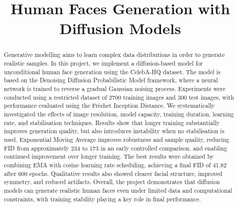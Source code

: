 \documentclass[conference]{IEEEtran}
\begin{document}
\title{Human Faces Generation with Diffusion Models\\
}

\author{
}


\maketitle

\begin{abstract}
Generative modelling aims to learn complex data distributions in order to generate realistic samples. In this project, we implement a diffusion-based model for unconditional human face generation using the CelebA-HQ dataset. The model is based on the Denoising Diffusion Probabilistic Model framework, where a neural network is trained to reverse a gradual Gaussian noising process. Experiments were conducted using a restricted dataset of 2700 training images and 300 test images, with performance evaluated using the Fréchet Inception Distance. We systematically investigated the effects of image resolution, model capacity, training duration, learning rate, and stabilisation techniques. Results show that longer training substantially improves generation quality, but also introduces instability when no stabilisation is used. Exponential Moving Average improves robustness and sample quality, reducing FID from approximately 234 to 173 in an early controlled comparison, and enabling continued improvement over longer training. The best results were obtained by combining EMA with cosine learning rate scheduling, achieving a final FID of 41.82 after 600 epochs. Qualitative results also showed clearer facial structure, improved symmetry, and reduced artifacts. Overall, the project demonstrates that diffusion models can generate realistic human faces even under limited data and computational constraints, with training stability playing a key role in final performance.
\end{abstract}
\end{document}
